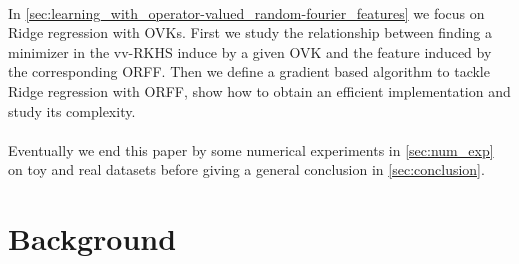 \documentclass[twoside,11pt]{article}
\begin{document}
\paragraph{}
In \cref{sec:learning_with_operator-valued_random-fourier_features} we focus on
Ridge regression with \acsp{OVK}. First we study the relationship between
finding a minimizer in the \acs{vv-RKHS} induce by a given \acs{OVK} and the
feature induced by the corresponding \acs{ORFF}. Then we define a gradient
based algorithm to tackle Ridge regression with \acs{ORFF}, show how to
obtain an efficient implementation and study its complexity.
\paragraph{}
Eventually we end this paper by some numerical experiments in
\cref{sec:num_exp} on toy and real datasets before giving a general conclusion
in  \cref{sec:conclusion}.

\section{Background}
\label{sec:background}

\end{document}
